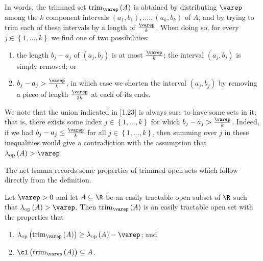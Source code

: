 \documentclass[pmath450]{subfiles}
\begin{document}
    \np In words, the trimmed set $\trim_{\varep}\left( A \right)$ is obtained by distributing $\varep$ among the $k$ component intervals $\left( a_1,b_1 \right),\ldots.,\left( a_k,b_k \right)$ of $A$, and by trying to trim each of these intervals by a length of $\frac{\varep}{k}$. When doing so, for every $j\in\left\lbrace 1,\ldots,k \right\rbrace$ we find one of two possibilities:
    \begin{enumerate}
        \item the length $b_j-a_j$ of $\left( a_j,b_j \right)$ is at most $\frac{\varep}{k}$; the interval $\left( a_j,b_j \right)$ is simply removed; or
        \item $b_j-a_j>\frac{\varep}{k}$, in which case we shorten the interval $\left( a_j,b_j \right)$ by removing a piece of length $\frac{\varep}{2k}$ at each of its ends.
    \end{enumerate}
    We note that the union indicated in [1.23] is always sure to have some sets in it; that is, there exists some index $j\in\left\lbrace 1,\ldots,k \right\rbrace$ for which $b_j-a_j>\frac{\varep}{k}$. Indeed, if we had $b_j-a_j\leq \frac{\varep}{k}$ for all $j\in\left\lbrace 1,\ldots,k \right\rbrace$, then summing over $j$ in these inequalities would give a contradiction with the assumption that $\lambda_{\op}\left( A \right)>\varep$.

    \np The net lemma records some properties of trimmed open sets which follow directly from the definition.

    \clearpage
    \begin{lemma}{}
        Let $\varep>0$ and let $A\subseteq\R$ be an easily tractable open subset of $\R$ such that $\lambda_{\op}\left( A \right)>\varep$. Then $\trim_{\varep}\left( A \right)$ is an easily tractable open set with the properties that
        \begin{enumerate}
            \item $\lambda_{\op}\left( \trim_{\varep}\left( A \right) \right)\geq\lambda_{\op}\left( A \right)-\varep$; and
            \item $\cl\left( \trim_{\varep}\left( A \right) \right)\subseteq A$.
        \end{enumerate}
    \end{lemma}
\end{document}
